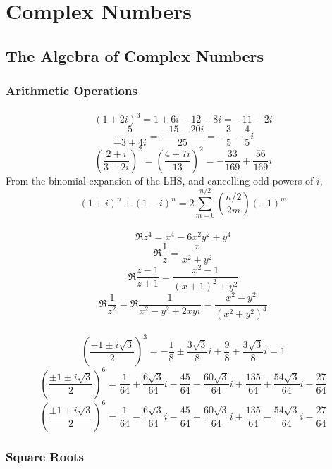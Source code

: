 \chapter{Complex Numbers}\label{ch:complex}
\section{The Algebra of Complex Numbers}
\subsection{Arithmetic Operations}
\subsubsection{}
\[(1+2i)^3 = 1+6i - 12-8i = \boxed{-11-2i}\]
\[\frac{5}{-3+4i} = \frac{-15-20i}{25} = \boxed{-\frac{3}{5}-\frac{4}{5}i}\]
\[\left(\frac{2+i}{3-2i}\right)^2 = \left(\frac{4+7i}{13}\right)^2=\boxed{-\frac{33}{169}+ \frac{56}{169}i}\]
From the binomial expansion of the LHS, and cancelling odd powers of \(i\),
\[(1+i)^n+(1-i)^n=2\sum_{m=0}^{n/2} \binom{n/2}{2m}(-1)^m\]
\subsubsection{}
\[\Re{z^4} = x^4-6x^2y^2+y^4\]
\[\Re\frac1z=\frac{x}{x^2+y^2}\]
\[\Re\frac{z-1}{z+1} = \frac{x^2-1}{(x+1)^2+y^2}\]
\[\Re\frac{1}{z^2} = \Re\frac{1}{x^2-y^2+2xyi}=\frac{x^2-y^2}{(x^2+y^2)^4}\]
\subsubsection{}
\[\left(\frac{-1\pm i \sqrt{3}}{2}\right)^3 = -\frac{1}{8}\pm \frac{3\sqrt{3}}{8}i+\frac{9}{8}\mp\frac{3\sqrt{3}}{8}i=1\]
\[\left(\frac{\pm1\pm i\sqrt{3}}{2}\right)^6=\frac{1}{64}+\frac{6\sqrt{3}}{64}i-\frac{45}{64}-\frac{60\sqrt{3}}{64}i+\frac{135}{64}+\frac{54\sqrt{3}}{64}i-\frac{27}{64}\]
\[\left(\frac{\pm1\mp i\sqrt{3}}{2}\right)^6=\frac{1}{64}-\frac{6\sqrt{3}}{64}i-\frac{45}{64}+\frac{60\sqrt{3}}{64}i+\frac{135}{64}-\frac{54\sqrt{3}}{64}i-\frac{27}{64}\]
\subsection{Square Roots}
